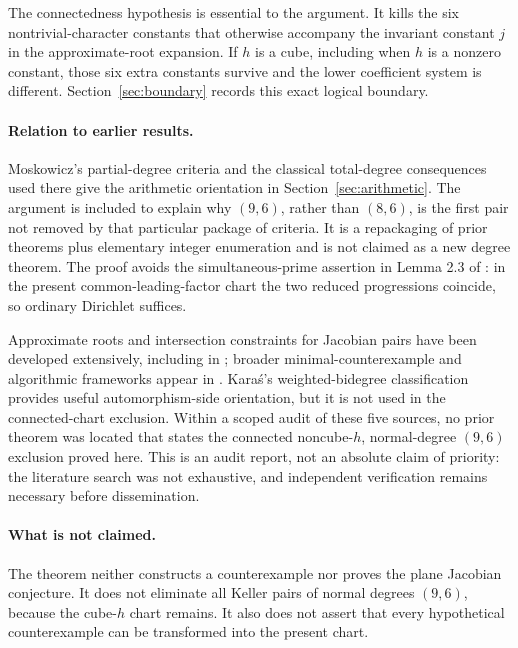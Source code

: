 \documentclass[11pt]{article}
\theoremstyle{definition}
\theoremstyle{remark}
\begin{document}
The connectedness hypothesis is essential to the argument.  It kills
the six nontrivial-character constants that otherwise accompany the
invariant constant \(j\) in the approximate-root expansion.  If \(h\)
is a cube, including when \(h\) is a nonzero constant, those six extra
constants survive and the lower coefficient system is different.
Section~\ref{sec:boundary} records this exact logical boundary.

\paragraph{Relation to earlier results.}
Moskowicz's partial-degree criteria \cite{Moskowicz} and the classical
total-degree consequences used there give the arithmetic orientation
in Section~\ref{sec:arithmetic}.  The argument is included to explain
why \((9,6)\), rather than \((8,6)\), is the first pair not removed by
that particular package of criteria.  It is a repackaging of prior
theorems plus elementary integer enumeration and is not claimed as a
new degree theorem.  The proof avoids the simultaneous-prime assertion
in Lemma 2.3 of \cite{Moskowicz}: in the present common-leading-factor
chart the two reduced progressions coincide, so ordinary Dirichlet
suffices.

Approximate roots and intersection constraints for Jacobian pairs have
been developed extensively, including in \cite{GGHVApprox}; broader
minimal-counterexample and algorithmic frameworks appear in
\cite{GGVShape,GGHVAlgorithms}.  Kara\'s's weighted-bidegree
classification \cite{Karas} provides useful automorphism-side
orientation, but it is not used in the connected-chart exclusion.
Within a scoped audit of these five sources, no prior theorem was
located that states the connected noncube-\(h\), normal-degree
\((9,6)\) exclusion proved here.  This is an audit report, not an
absolute claim of priority: the literature search was not exhaustive,
and independent verification remains necessary before dissemination.

\paragraph{What is not claimed.}
The theorem neither constructs a counterexample nor proves the plane
Jacobian conjecture.  It does not eliminate all Keller pairs of normal
degrees \((9,6)\), because the cube-\(h\) chart remains.  It also does
not assert that every hypothetical counterexample can be transformed
into the present chart.
\end{document}
